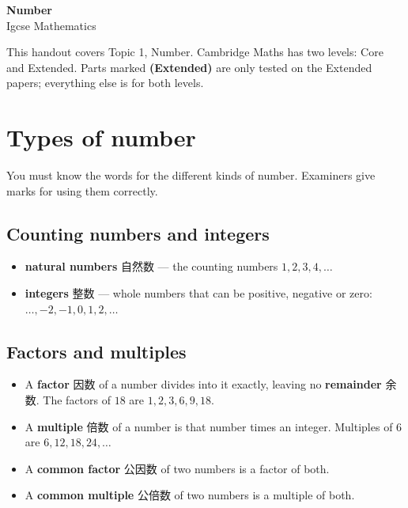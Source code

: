 \documentclass[11pt]{article}
\begin{document}
\begin{center}
  {\LARGE\bfseries Number}\\[0.35em]
  {\large Igcse Mathematics}
\end{center}
\vspace{0.6em}

This handout covers Topic 1, Number. Cambridge Maths has two levels: Core and Extended. Parts marked \textbf{(Extended)} are only tested on the Extended papers; everything else is for both levels.

\section*{Types of number}

You must know the words for the different kinds of number. Examiners give marks for using them correctly.

\subsection*{Counting numbers and integers}

\begin{itemize}
\item \textbf{natural numbers} 自然数 — the counting numbers $1, 2, 3, 4, \dots$

\item \textbf{integers} 整数 — whole numbers that can be positive, negative or zero: $\dots, -2, -1, 0, 1, 2, \dots$

\end{itemize}

\subsection*{Factors and multiples}

\begin{itemize}
\item A \textbf{factor} 因数 of a number divides into it exactly, leaving no \textbf{remainder} 余数. The factors of $18$ are $1, 2, 3, 6, 9, 18$.

\item A \textbf{multiple} 倍数 of a number is that number times an integer. Multiples of $6$ are $6, 12, 18, 24, \dots$

\item A \textbf{common factor} 公因数 of two numbers is a factor of both.

\item A \textbf{common multiple} 公倍数 of two numbers is a multiple of both.

\end{itemize}
\end{document}
